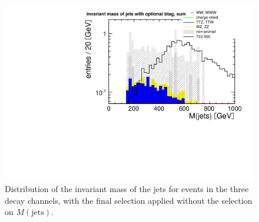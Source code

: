 \begin{figure}[htb]
    \centering
    \includegraphics[width=\textwidth]{images/pdf/4jets_AND_mr200_AND_r02/had_mass_optional_btag_sum_0}
    \caption{Distribution of the invariant mass of the jets for events in the three decay
        channels, with the final
        selection applied without the selection on $M(\text{jets})$.}
    \label{fig:nohadmass}
\end{figure}
